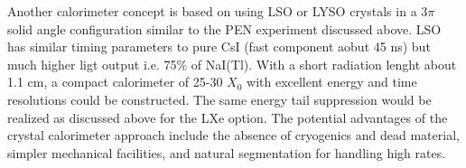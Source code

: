 

Another calorimeter concept is based on using LSO or LYSO crystals in a $3 \pi$ solid angle configuration similar to the PEN experiment discussed above. LSO has similar timing parameters to pure CsI (fast component aobut 45 ns) but much higher ligt output i.e. 75$\%$ of NaI(Tl). With a short radiation lenght about 1.1 cm, a compact calorimeter of 25-30 $X_0$ with excellent energy and time resolutions could be constructed. The same energy tail suppression would be realized as discussed above for the LXe option. The potential advantages of the crystal calorimeter approach include the absence of cryogenics and dead material, simpler mechanical facilities, and natural segmentation for handling high rates.